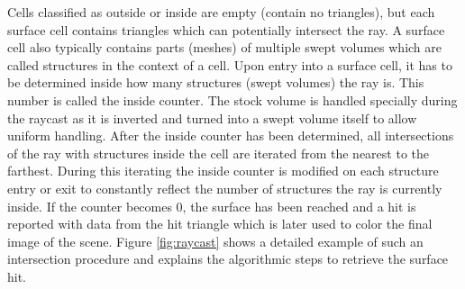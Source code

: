 Cells classified as outside or inside are empty (\ie contain no triangles), but each surface cell contains triangles which can potentially intersect the ray.
A surface cell also typically contains parts (meshes) of multiple swept volumes which are called structures in the context of a cell.
Upon entry into a surface cell, it has to be determined inside how many structures (swept volumes) the ray is.
This number is called the inside counter.
The stock volume is handled specially during the raycast as it is inverted and turned into a swept volume itself to allow uniform handling.
After the inside counter has been determined, all intersections of the ray with structures inside the cell are iterated from the nearest to the farthest.
During this iterating the inside counter is modified on each structure entry or exit to constantly reflect the number of structures the ray is currently inside.
If the counter becomes 0, the surface has been reached and a hit is reported with data from the hit triangle which is later used to color the final image of the scene.
Figure \ref{fig:raycast} shows a detailed example of such an intersection procedure and explains the algorithmic steps to retrieve the surface hit.

